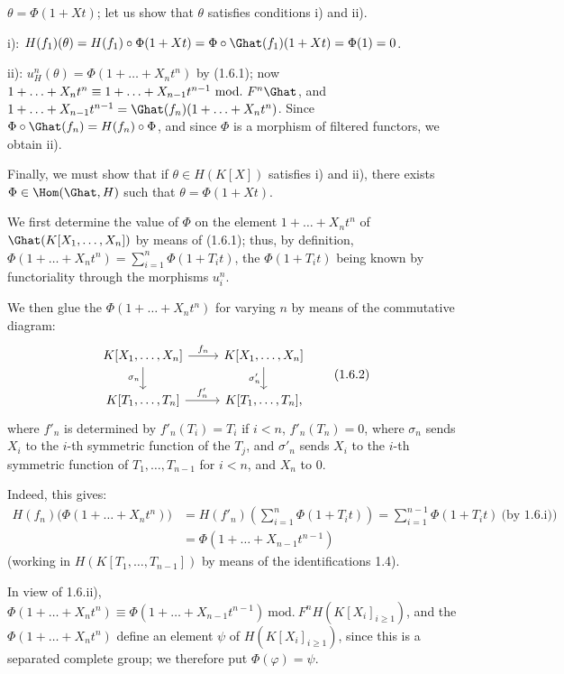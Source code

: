 %
\(\theta=\Phi(1+Xt)\);
let us show that \(\theta\) satisfies conditions i) and ii).

i): \(H(f_1)(\theta)=H(f_1)\circ\Phi(1+Xt)=\Phi\circ\Ghat(f_1)(1+Xt)=\Phi(1)=0\).

ii): \(u_H^n(\theta)=\Phi(1+\ldots+X_nt^n)\) by (1.6.1); now \(1+\ldots+X_nt^n\equiv 1+\ldots+X_{n-1}t^{n-1}\ \mathrm{mod.}\ F^n\Ghat\), and \(1+\ldots+X_{n-1}t^{n-1}=\Ghat(f_n)(1+\ldots+X_nt^n)\). Since \(\Phi\circ\Ghat(f_n)=H(f_n)\circ\Phi\), and since \(\Phi\) is a morphism of filtered functors, we obtain ii).

Finally, we must show that if \(\theta\in H(K[X])\) satisfies i) and ii), there exists \(\Phi\in\Hom(\Ghat,H)\) such that \(\theta=\Phi(1+Xt)\).

We first determine the value of \(\Phi\) on the element \(1+\ldots+X_nt^n\) of \(\Ghat(K[X_1,\ldots,X_n])\) by means of (1.6.1); thus, by definition, \(\Phi(1+\ldots+X_nt^n)=\sum\limits_{i=1}^n \Phi(1+T_it)\), the \(\Phi(1+T_it)\) being known by functoriality through the morphisms \(u_i^n\).

We then glue the \(\Phi(1+\ldots+X_nt^n)\) for varying \(n\) by means of the commutative diagram:
\[
\begin{tikzcd}
K[X_1,\ldots,X_n] \arrow[r,"f_n"] \arrow[d,"\sigma_n"'] &
K[X_1,\ldots,X_n] \arrow[d,"\sigma'_n"']\\
K[T_1,\ldots,T_n] \arrow[r,"f'_n"] &
K[T_1,\ldots,T_n],
\end{tikzcd}
\tag{1.6.2}
\]
where \(f'_n\) is determined by \(f'_n(T_i)=T_i\) if \(i<n\), \(f'_n(T_n)=0\), where \(\sigma_n\) sends \(X_i\) to the \(i\)-th symmetric function of the \(T_j\), and \(\sigma'_n\) sends \(X_i\) to the \(i\)-th symmetric function of \(T_1,\ldots,T_{n-1}\) for \(i<n\), and \(X_n\) to \(0\).

Indeed, this gives:
\[
\begin{aligned}
H(f_n)\bigl(\Phi(1+\ldots+X_nt^n)\bigr)
&=H(f'_n)\left(\sum_{i=1}^n \Phi(1+T_it)\right)
=\sum_{i=1}^{n-1}\Phi(1+T_it)\ \text{(by 1.6.i))}\\
&=\Phi(1+\ldots+X_{n-1}t^{n-1})
\end{aligned}
\]
%
(working in \(H(K[T_1,\ldots,T_{n-1}])\) by means of the identifications 1.4).

In view of 1.6.ii), \(\Phi(1+\ldots+X_nt^n)\equiv\Phi(1+\ldots+X_{n-1}t^{n-1})\ \mathrm{mod.}\ F^nH(K[X_i]_{i\geq1})\), and the \(\Phi(1+\ldots+X_nt^n)\) define an element \(\psi\) of \(H(K[X_i]_{i\geq1})\), since this is a separated complete group; we therefore put \(\Phi(\varphi)=\psi\).

